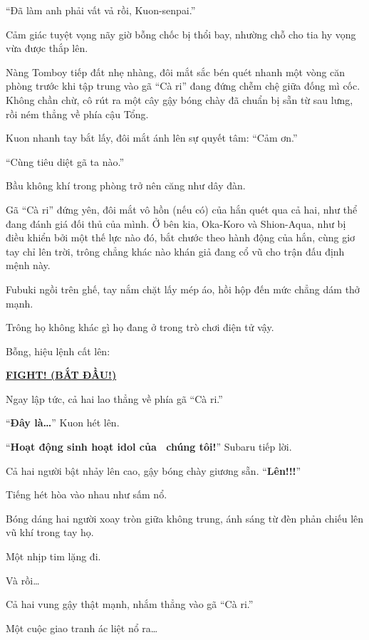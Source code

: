 \documentclass[../main.tex]{subfiles}
\begin{document}
``Đã làm anh phải vất vả rồi, Kuon-senpai.''

Cảm giác tuyệt vọng nãy giờ bỗng chốc bị thổi bay, nhường chỗ cho tia hy vọng vừa được thắp lên.

Nàng Tomboy tiếp đất nhẹ nhàng, đôi mắt sắc bén quét nhanh một vòng căn phòng trước khi tập trung vào gã ``Cà ri'' đang đứng chễm chệ giữa đống mì cốc. Không chần chừ, cô rút ra một cây gậy bóng chày đã chuẩn bị sẵn từ sau lưng, rồi ném thẳng về phía cậu Tổng.

Kuon nhanh tay bắt lấy, đôi mắt ánh lên sự quyết tâm: ``Cảm ơn.''

``Cùng tiêu diệt gã ta nào.''

Bầu không khí trong phòng trở nên căng như dây đàn.

Gã ``Cà ri'' đứng yên, đôi mắt vô hồn (nếu có) của hắn quét qua cả hai, như thể đang đánh giá đối thủ của mình. Ở bên kia, Oka-Koro và Shion-Aqua, như bị điều khiển bởi một thế lực nào đó, bắt chước theo hành động của hắn, cùng giơ tay chỉ lên trời, trông chẳng khác nào khán giả đang cổ vũ cho trận đấu định mệnh này.

Fubuki ngồi trên ghế, tay nắm chặt lấy mép áo, hồi hộp đến mức chẳng dám thở mạnh.

Trông họ không khác gì họ đang ở trong trò chơi điện tử vậy.


Bỗng, hiệu lệnh cất lên:

\begin{center}
    \uline{\textbf{FIGHT! (BẮT ĐẦU!)}}
\end{center}

Ngay lập tức, cả hai lao thẳng về phía gã ``Cà ri.''

``\textbf{Đây là\dots}'' Kuon hét lên.

``\textbf{Hoạt động sinh hoạt idol của \hll\ chúng tôi!}'' Subaru tiếp lời.

Cả hai người bật nhảy lên cao, gậy bóng chày giương sẵn. ``\textbf{Lên!!!}''

Tiếng hét hòa vào nhau như sấm nổ.

Bóng dáng hai người xoay tròn giữa không trung, ánh sáng từ đèn phản chiếu lên vũ khí trong tay họ.

Một nhịp tim lặng đi.

Và rồi\dots

Cả hai vung gậy thật mạnh, nhắm thẳng vào gã ``Cà ri.''

Một cuộc giao tranh ác liệt nổ ra\dots
\end{document}
